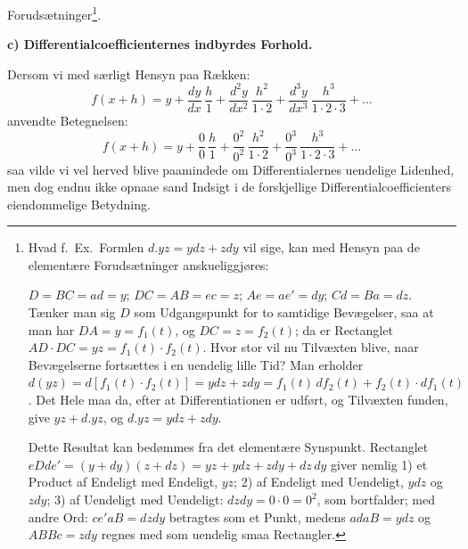 \documentclass[12pt]{book}
\newcommand{\opage}[1]{\marginnote{\footnotesize\textit{[#1]}}}
\begin{document}
Forudsætninger\footnote{Hvad f.\ Ex.\ Formlen $d.yz = ydz + zdy$ vil sige, kan med
Hensyn paa de elementære Forudsætninger anskueliggjøres:
\begin{center}
\end{center}
$D = BC = ad = y$; $DC = AB = ec = z$; $Ae = ae' = dy$; $Cd = Ba = dz$. Tænker man
sig $D$ som Udgangspunkt for to samtidige Bevægelser, saa at man har
$DA = y = f_{1}(t)$, og $DC = z = f_{2}(t)$; da er Rectanglet
$AD\cdot DC = yz = f_{1}(t)\cdot f_{2}(t)$. Hvor stor vil nu Tilvæxten blive, naar
Bevægelserne fortsættes i en uendelig lille Tid? Man erholder
$d(yz) = d[f_{1}(t)\cdot f_{2}(t)] = ydz + zdy = f_{1}(t)\, d f_{2}(t)
+ f_{2}(t)\cdot d f_{1}(t)$. Det Hele maa da, efter at Differentiationen er udført,
og Tilvæxten funden, give $yz + d.yz$, og $d.yz = ydz + zdy$.

Dette Resultat kan bedømmes fra det elementære Synspunkt. Rectanglet
$eDde' = (y + dy)(z + dz) = yz + ydz + zdy + dz\,dy$ giver nemlig 1) et Product af
Endeligt med Endeligt, $yz$; 2) af Endeligt med Uendeligt, $ydz$ og $zdy$; 3) af
Uendeligt med Uendeligt: $dzdy = 0\cdot0 = 0^{2}$, som bortfalder; med andre Ord:
$ce'aB = dzdy$ betragtes som et Punkt, medens $adaB = ydz$ og $ABBc = zdy$ regnes
med som uendelig smaa Rectangler.}.
\opage{60} \begin{center}
\textbf{c) Differentialcoefficienternes indbyrdes Forhold.}
\end{center}
{}

Dersom vi med særligt Hensyn paa Rækken:
\[
f(x + h) = y + \frac{dy}{dx}\,\frac{h}{1} + \frac{d^{2}y}{dx^{2}}\,
\frac{h^{2}}{1\cdot2} + \frac{d^{3}y}{dx^{3}}\,\frac{h^{3}}{1\cdot2\cdot3} + \dots
\]
anvendte Betegnelsen:
\[
f(x + h) = y + \frac{0}{0}\,\frac{h}{1} + \frac{0^{2}}{0^{2}}\,\frac{h^{2}}{1\cdot2}
+ \frac{0^{3}}{0^{3}}\,\frac{h^{3}}{1\cdot2\cdot3} + \dots
\]
saa vilde vi vel herved blive paamindede om Differentialernes uendelige Lidenhed,
men dog endnu ikke opnaae sand Indsigt i de forskjellige Differentialcoefficienters
eiendommelige Betydning.
\end{document}
